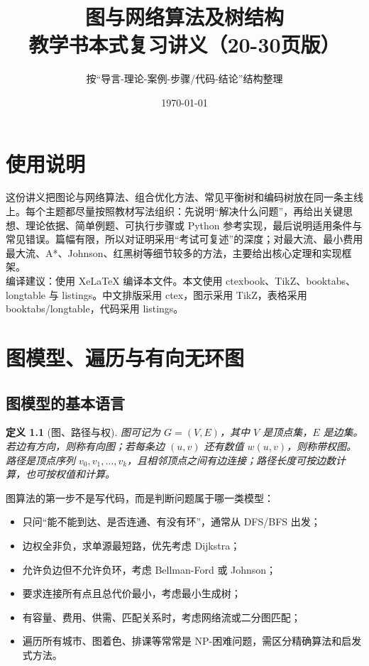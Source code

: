 \documentclass[UTF8,oneside,12pt]{ctexbook}
\title{图与网络算法及树结构\\\large 教学书本式复习讲义（20-30页版）}
\author{按“导言-理论-案例-步骤/代码-结论”结构整理}
\date{\today}
\newtheorem{definition}{定义}[chapter]
\begin{document}
\maketitle
\frontmatter
\chapter*{使用说明}
这份讲义把图论与网络算法、组合优化方法、常见平衡树和编码树放在同一条主线上。每个主题都尽量按照教材写法组织：先说明“解决什么问题”，再给出关键思想、理论依据、简单例题、可执行步骤或 Python 参考实现，最后说明适用条件与常见错误。篇幅有限，所以对证明采用“考试可复述”的深度；对最大流、最小费用最大流、A*、Johnson、红黑树等细节较多的方法，主要给出核心定理和实现框架。\\
编译建议：使用 XeLaTeX 编译本文件。本文使用 ctexbook、TikZ、booktabs、longtable 与 listings。中文排版采用 ctex，图示采用 TikZ，表格采用 booktabs/longtable，代码采用 listings。
\tableofcontents
\mainmatter

\chapter{图模型、遍历与有向无环图}
\section{图模型的基本语言}
\begin{definition}[图、路径与权]
图可记为 $G=(V,E)$，其中 $V$ 是顶点集，$E$ 是边集。若边有方向，则称有向图；若每条边 $(u,v)$ 还有数值 $w(u,v)$，则称带权图。路径是顶点序列 $v_0,v_1,\ldots,v_k$，且相邻顶点之间有边连接；路径长度可按边数计算，也可按权值和计算。
\end{definition}

图算法的第一步不是写代码，而是判断问题属于哪一类模型：
\begin{itemize}
  \item 只问“能不能到达、是否连通、有没有环”，通常从 DFS/BFS 出发；
  \item 边权全非负，求单源最短路，优先考虑 Dijkstra；
  \item 允许负边但不允许负环，考虑 Bellman-Ford 或 Johnson；
  \item 要求连接所有点且总代价最小，考虑最小生成树；
  \item 有容量、费用、供需、匹配关系时，考虑网络流或二分图匹配；
  \item 遍历所有城市、图着色、排课等常常是 NP-困难问题，需区分精确算法和启发式方法。
\end{itemize}
\end{document}
